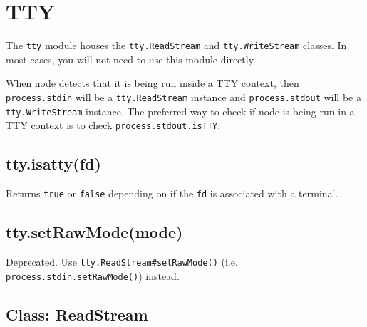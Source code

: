 \section{TTY}\label{tty}

\begin{Shaded}
\begin{Highlighting}[]
 
\end{Highlighting}
\end{Shaded}

The \texttt{tty} module houses the \texttt{tty.ReadStream} and
\texttt{tty.WriteStream} classes. In most cases, you will not need to
use this module directly.

When node detects that it is being run inside a TTY context, then
\texttt{process.stdin} will be a \texttt{tty.ReadStream} instance and
\texttt{process.stdout} will be a \texttt{tty.WriteStream} instance. The
preferred way to check if node is being run in a TTY context is to check
\texttt{process.stdout.isTTY}:

\begin{Shaded}
\begin{Highlighting}[]
 
\end{Highlighting}
\end{Shaded}

\subsection{tty.isatty(fd)}\label{tty.isattyfd}

Returns \texttt{true} or \texttt{false} depending on if the \texttt{fd}
is associated with a terminal.

\subsection{tty.setRawMode(mode)}\label{tty.setrawmodemode}

Deprecated. Use \texttt{tty.ReadStream\#setRawMode()} (i.e.
\texttt{process.stdin.setRawMode()}) instead.

\subsection{Class: ReadStream}\label{class-readstream}

